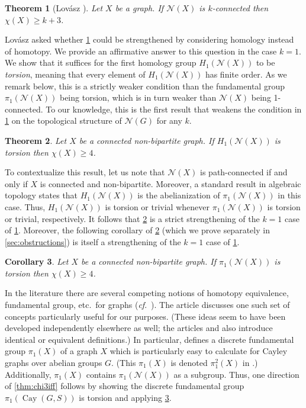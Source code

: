 \documentclass[12pt,letterpaper]{amsart}
\newtheorem{theorem}{Theorem}[section]
\newtheorem{corollary}[theorem]{Corollary}
\theoremstyle{definition}
\theoremstyle{remark}
\newcommand{\N}{{\mathcal N}}
\DeclareMathOperator{\Cay}{Cay}
\begin{document}
\begin{theorem}[Lov\'asz \cite{Lov}]\label{thm:lovasz}
Let $X$ be a graph. If $\N(X)$ is $k$-connected then $\chi(X)\geq k+3$.	
\end{theorem}

Lov\'asz asked whether \cref{thm:lovasz} could be strengthened by considering homology instead of homotopy. We provide an affirmative answer to this question in the case $k=1$. We show that it suffices for the first homology group $H_1(\N(X))$ to be \emph{torsion}, meaning that every element of $H_1(\N(X))$ has finite order. As we remark below, this is a strictly weaker condition than the fundamental group $\pi_1(\N(X))$ being torsion, which is in turn weaker than $\N(X)$ being 1-connected. 
To our knowledge, this is the first result that weakens the condition in \cref{thm:lovasz} on the topological structure of $\N(G)$ for any $k$.

\begin{theorem}\label{thm:homology}
Let $X$ be a connected non-bipartite graph. If $H_1(\N(X))$ is torsion then $\chi(X)\geq 4$.	
\end{theorem}

To contextualize this result, let us note that $\N(X)$ is path-connected if and only if $X$ is connected and non-bipartite. Moreover, a standard result in algebraic topology \cite[Theorem 2A.1]{Hat} states that $H_1(\N(X))$ is the abelianization of $\pi_1(\N(X))$ in this case. Thus, $H_1(\N(X))$ is torsion or trivial whenever $\pi_1(\N(X))$ is torsion or trivial, respectively. It follows that \cref{thm:homology} is a strict strengthening of the $k=1$ case of \cref{thm:lovasz}.  Moreover, the following corollary of \cref{thm:homology} (which we prove separately in \cref{sec:obstructions}) is itself a strengthening of the $k=1$ case of \cref{thm:lovasz}.

\begin{corollary}\label{cor:pi1-torsion}
Let $X$ be a connected non-bipartite graph. If $\pi_1(\N(X))$ is torsion then $\chi(X)\geq 4$.	
\end{corollary}




In the literature there are several competing notions of homotopy equivalence, fundamental group, etc.\ for graphs ({\it cf}.\ \cite{Mal}). The article \cite{San} discusses one such set of concepts particularly useful for our purposes. (These ideas seem to have been developed independently elsewhere as well; the articles \cite{matsushita} and \cite{wrochna} also introduce identical or equivalent definitions.) In particular, \cite{San} defines a discrete fundamental group $\pi_1(X)$ of a graph $X$ which is particularly easy to calculate for Cayley graphs over abelian groups $G$. (This $\pi_1(X)$ is denoted $\pi^2_1(X)$ in \cite{matsushita}.) Additionally, $\pi_1(X)$ contains $\pi_1(\N(X))$ as a subgroup. Thus, one direction of \cref{thm:chi3iff} follows by showing the discrete fundamental group $\pi_1(\Cay(G,S))$ is torsion and applying \cref{cor:pi1-torsion}.
\end{document}

